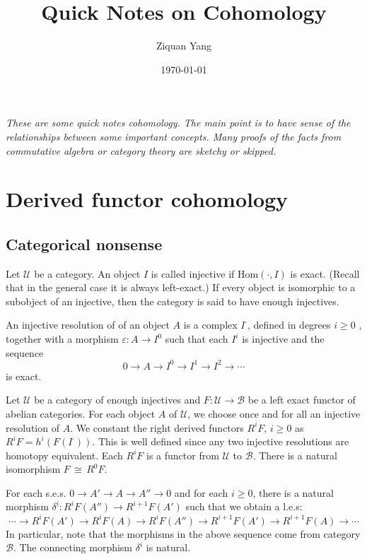 \documentclass[12pt]{article}
\theoremstyle{plain}
\theoremstyle{definition}
\newcommand{\sB}{\mathcal{B}}
\newcommand{\sU}{\mathcal{U}}
\newcommand{\Hom}{\mathrm{Hom}}
\newcommand\iso{{\, \cong \,}}
\newcommand{\<}{\langle}
\renewcommand{\>}{\rangle}
\newcommand{\sm}{\varepsilon}
\begin{document}
%

\title{Quick Notes on Cohomology}
\author{Ziquan Yang}


\date{\today}

\maketitle

\textsl{These are some quick notes cohomology. The main point is to have sense of the relationships between some important concepts. Many proofs of the facts from commutative algebra or category theory are sketchy or skipped.}
 


\setcounter{section}{0}
\section{Derived functor cohomology}
\subsection{Categorical nonsense}
Let $\sU$ be a category. An object $I$ is called injective if $\Hom(\cdot, I)$ is exact. (Recall that in the general case it is always left-exact.) If every object is isomorphic to a subobject of an injective, then the category is said to have enough injectives. 

An injective resolution of of an object $A$ is a complex $I^\cdot$, defined in degrees $i \ge 0$ , together with a morphism $\sm : A \to I^0$ such that each $I^i$ is injective and the sequence 
$$ 0 \to A \to I^0 \to I^1 \to I^2 \to \cdots $$
is exact. 

Let $\sU$ be a category of enough injectives and $F : \sU \to \sB$ be a left exact functor of abelian categories. For each object $A$ of $\sU$, we choose once and for all an injective resolution of $A$. We constant the right derived functors $R^i F$, $i \ge 0$ as $R^i F = h^i (F(I^\cdot))$. This is well defined since any two injective resolutions are homotopy equivalent. Each $R^i F$ is a functor from $\sU$ to $\sB$. There is a natural isomorphism $F \iso R^0 F$. 

For each s.e.s. $0 \to A' \to A \to A'' \to 0$ and for each $i \ge 0$, there is a natural morphism $\delta^i : R^i F (A'') \to R^{ i + 1} F(A')$ such that we obtain a l.e.s:
$$ \cdots \to R^i F(A') \to R^i F(A) \to R^i F (A'') \to R^{i + 1} F (A') \to R^{i + 1} F(A) \to \cdots $$
In particular, note that the morphisms in the above sequence come from category $\sB$. The connecting morphism $\delta^i$ is natural. 
\end{document}
